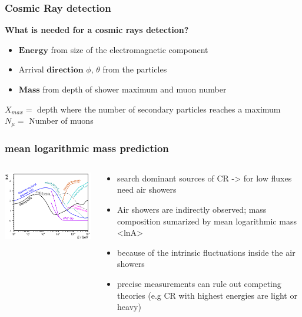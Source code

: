 \documentclass[aspectratio=1610, 9pt]{beamer}
\begin{document}
\begin{frame}\frametitle{Cosmic Ray detection}
  \textbf{What is needed for a cosmic rays detection?}
  \begin{itemize}
    \item $\symbf{Energy}$ from size of the electromagnetic component
    \item Arrival $\symbf{direction}$ $\phi$, $\theta$ from the particles
    \item $\symbf{Mass}$ from depth of shower maximum and muon number
  \end{itemize}
  $X_{max} =$ depth where the number of secondary particles reaches a maximum \\
  $N_{\mu} =$ Number of muons
\end{frame}

\begin{frame}\frametitle{mean logarithmic mass prediction}
  \begin{columns}
    \begin{column}[c]{0.48\textwidth}
      \includegraphics{plots/lnA_left.png}
    \end{column}
    \begin{column}[c]{0.48\textwidth}
      \begin{itemize}
        \item search dominant sources of CR -> for low fluxes need air showers
        \item Air showers are indirectly observed; mass composition sumarized by
        mean logarithmic mass <lnA> %
        \item because of the intrinsic fluctuations inside the air showers
        \item precise measurements can rule out competing theories (e.g CR with
        highest energies are light or heavy)
      \end{itemize}
    \end{column}
  \end{columns}
\end{frame}
\end{document}
